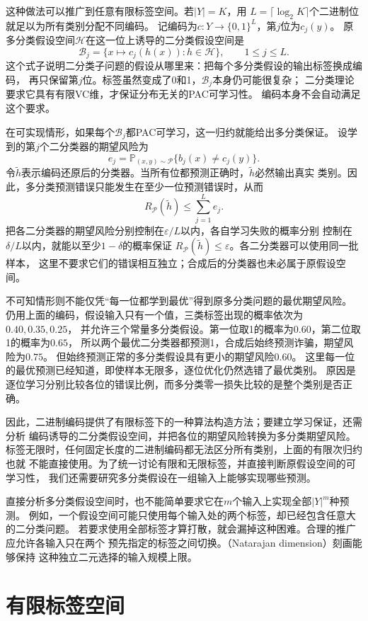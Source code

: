 这种做法可以推广到任意有限标签空间。若$|Y|=K$，用
$L=\lceil\log_2K\rceil$个二进制位就足以为所有类别分配不同编码。
记编码为$c:Y\to\{0,1\}^L$，第$j$位为$c_j(y)$。
原多分类假设空间$\mathcal H$在这一位上诱导的二分类假设空间是
\[
 \mathcal B_j=\{x\mapsto c_j(h(x)):h\in\mathcal H\},\qquad 1\leq j\leq L.
\]
这个式子说明二分类子问题的假设从哪里来：把每个多分类假设的输出标签换成编码，
再只保留第$j$位。标签虽然变成了0和1，$\mathcal B_j$本身仍可能很复杂；
二分类理论要求它具有有限VC维，才保证分布无关的PAC可学习性。
编码本身不会自动满足这个要求。

在可实现情形，如果每个$\mathcal B_j$都PAC可学习，这一归约就能给出多分类保证。
设学到的第$j$个二分类器的期望风险为
\[
 e_j=\mathbb P_{(x,y)\sim\mathcal P}\{b_j(x)\neq c_j(y)\}.
\]
令$\tilde h$表示编码还原后的分类器。当所有位都预测正确时，$\tilde h$必然输出真实
类别。因此，多分类预测错误只能发生在至少一位预测错误时，从而
\[
 R_{\mathcal P}(\tilde h)\leq\sum_{j=1}^L e_j.
\]
把各二分类器的期望风险分别控制在$\varepsilon/L$以内，各自学习失败的概率分别
控制在$\delta/L$以内，就能以至少$1-\delta$的概率保证
$R_{\mathcal P}(\tilde h)\leq\varepsilon$。各二分类器可以使用同一批样本，
这里不要求它们的错误相互独立；合成后的分类器也未必属于原假设空间。

不可知情形则不能仅凭“每一位都学到最优”得到原多分类问题的最优期望风险。
仍用上面的编码，假设输入只有一个值，三类标签出现的概率依次为$0.40,0.35,0.25$，
并允许三个常量多分类假设。第一位取1的概率为$0.60$，第二位取1的概率为$0.65$，
所以两个最优二分类器都预测1，合成后始终预测诈骗，期望风险为$0.75$。
但始终预测正常的多分类假设具有更小的期望风险$0.60$。
这里每一位的最优预测已经知道，即使样本无限多，逐位优化仍然选错了最优类别。
原因是逐位学习分别比较各位的错误比例，而多分类零一损失比较的是整个类别是否正确。

因此，二进制编码提供了有限标签下的一种算法构造方法；要建立学习保证，还需分析
编码诱导的二分类假设空间，并把各位的期望风险转换为多分类期望风险。
标签无限时，任何固定长度的二进制编码都无法区分所有类别，上面的有限次归约也就
不能直接使用。为了统一讨论有限和无限标签，并直接判断原假设空间的可学习性，
我们还需要研究多分类假设在一组输入上能够实现哪些预测。

直接分析多分类假设空间时，也不能简单要求它在$m$个输入上实现全部$|Y|^m$种预测。
例如，一个假设空间可能只使用每个输入处的两个标签，却已经包含任意大的二分类问题。
若要求使用全部标签才算打散，就会漏掉这种困难。合理的推广应允许各输入只在两个
预先指定的标签之间切换。（Natarajan dimension）刻画能够保持
这种独立二元选择的输入规模上限。

\section{有限标签空间}
\label{sec:multiclass-dimensions}
\label{sec:finite-label-learning}

